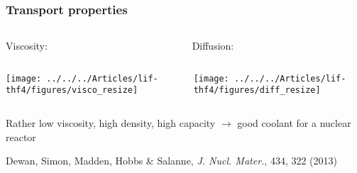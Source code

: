 \documentclass{beamer}
\begin{document}
\begin{frame}
   \frametitle{Transport properties}
   \begin{columns}
      \begin{column}{6cm}
      Viscosity:
      \end{column}
      \begin{column}{6cm}
      Diffusion:
      \end{column}
   \end{columns}
   \begin{columns}
      \begin{column}{6cm}
      \begin{center}
       \texttt{[image: ../../../Articles/lif-thf4/figures/visco\_resize]}
      \end{center}
      \end{column}
      \begin{column}{6cm}
      \begin{center}
       \texttt{[image: ../../../Articles/lif-thf4/figures/diff\_resize]}
      \end{center}
      \end{column}
   \end{columns}

    \vspace{0.5cm}
    Rather low viscosity, high density, high capacity $\rightarrow$ \alert{good coolant for a nuclear reactor} 
    \vspace{0.2cm}
    \begin{center}
   \scriptsize{Dewan, Simon, Madden, Hobbs \& Salanne, {\it J. Nucl. Mater.}, 434, 322 (2013)}
    \end{center}
   
\end{frame}
\end{document}
